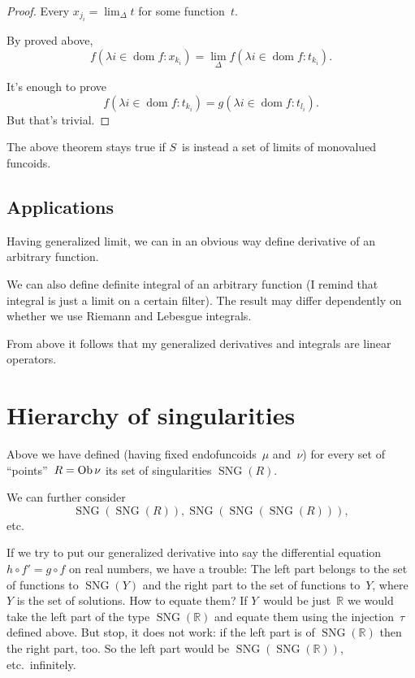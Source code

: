 \begin{proof}
Every $x_{j_i} = \lim_{\Delta} t$ for some function~$t$.

By proved above, \[ f (\lambda i \in \operatorname{dom} f : x_{k_i}) = \lim_{\Delta} f(\lambda i \in \operatorname{dom} f : t_{k_i}). \]

It's enough to prove \[ f(\lambda i \in \operatorname{dom} f : t_{k_i}) = g(\lambda i \in \operatorname{dom} f : t_{l_i}). \]
But that's trivial.
\end{proof}

\begin{conjecture}
The above theorem stays true if $S$~is instead a set of limits of monovalued funcoids.
\end{conjecture}

\section{Applications}

Having generalized limit, we can in an obvious way define derivative of an arbitrary function.

We can also define definite integral of an arbitrary function (I remind that integral is just a limit on a certain filter). The result may differ dependently on whether we use Riemann and Lebesgue integrals.

From above it follows that my generalized derivatives and integrals are linear operators.

\chapter{Hierarchy of singularities}

Above we have defined (having fixed endofuncoids~$\mu$ and~$\nu$) for every set of ``points''~$R=\operatorname{Ob}\nu$ its set of singularities $\operatorname{SNG}(R)$.

We can further consider
\[
\operatorname{SNG}(\operatorname{SNG}(R)), \operatorname{SNG}(\operatorname{SNG}(\operatorname{SNG}(R))),
\]
etc.

If we try to put our generalized derivative into say the differential equation $h\circ f'=g\circ f$ on real numbers, we have a trouble: The left part belongs to the set of functions to $\operatorname{SNG}(Y)$ and the right part to the set of functions to~$Y$, where $Y$ is the set of solutions. How to equate them? If $Y$~would be just~$\mathbb{R}$ we would take the left part of the type $\operatorname{SNG}(\mathbb{R})$ and equate them using the injection~$\tau$ defined above. But stop, it does not work: if the left part is of $\operatorname{SNG}(\mathbb{R})$ then the right part, too. So the left part would be $\operatorname{SNG}(\operatorname{SNG}(\mathbb{R}))$, etc.\ infinitely.

